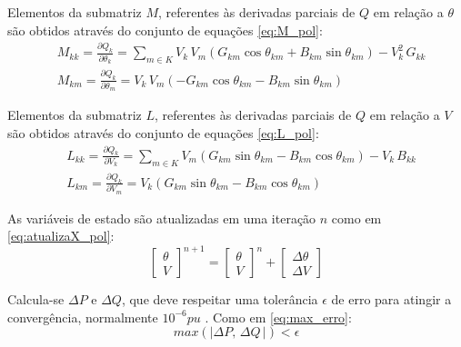 Elementos da submatriz $M$, referentes às derivadas parciais de $Q$ em relação a $\theta$ são obtidos através do conjunto de equações \eqref{eq:M_pol}:
\begin{equation} \label{eq:M_pol}
    \begin{split}
        &M_{kk} = \frac{\partial Q_k}{\partial \theta_k} =
        \sum_{m \in K} V_k\,V_m(G_{km}\cos{\theta_{km}}+B_{km}\sin{\theta_{km}})-V_k^2\,G_{kk}\\
        &M_{km} = \frac{\partial Q_k}{\partial \theta_m} = 
        V_k\,V_m (-G_{km}\cos{\theta_{km}} - B_{km}\sin{\theta_{km}})
    \end{split}
\end{equation}

Elementos da submatriz $L$, referentes às derivadas parciais de $Q$ em relação a $V$ são obtidos através do conjunto de equações \eqref{eq:L_pol}:
\begin{equation} \label{eq:L_pol}
    \begin{split}
        &L_{kk} = \frac{\partial Q_k}{\partial V_k} = 
         \sum_{m \in K}V_m(G_{km}\sin{\theta_{km}}-B_{km}\cos{\theta_{km}})-V_k\,B_{kk}\\
        &L_{km} = \frac{\partial Q_k}{\partial V_m} = 
         V_k(G_{km}\sin \theta_{km}-B_{km}\cos{\theta_{km}})
    \end{split}
\end{equation}

As variáveis de estado são atualizadas em uma iteração $n$ como em \eqref{eq:atualizaX_pol}:
\begin{equation}\label{eq:atualizaX_pol}
     \begin{bmatrix}
        \theta\\
         V
    \end{bmatrix}
    ^{n+1}
    =
     \begin{bmatrix}
        \theta\\
         V
    \end{bmatrix}
    ^{n}
    +
    \begin{bmatrix}
        \Delta \theta\\
        \Delta V
    \end{bmatrix}  
\end{equation}

Calcula-se $\Delta P$ e $\Delta Q$, que deve respeitar uma tolerância $\epsilon$ de erro para atingir a convergência, normalmente $10^{-6}pu$ \cite{FluxoDePotenciaIgor}. Como em \eqref{eq:max_erro}:
\begin{equation}\label{eq:max_erro}
    max(|\Delta P,\,\Delta Q\,|)<\epsilon
\end{equation}

